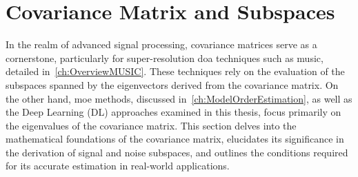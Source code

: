 




\section{Covariance Matrix and Subspaces}
\label{sec:CovarianceMatrix}
In the realm of advanced signal processing, covariance matrices serve as a cornerstone, particularly for
super-resolution \gls{doa} techniques such as \gls{music}, detailed in~\autoref{ch:OverviewMUSIC}. These techniques rely
on the evaluation of the subspaces spanned by the eigenvectors derived from the covariance matrix.
On the other hand, \gls{moe} methods, discussed in~\autoref{ch:ModelOrderEstimation}, as well as the Deep Learning (DL) approaches
examined in this thesis, focus primarily on the eigenvalues of the covariance matrix. This section delves into the
mathematical foundations of the covariance matrix, elucidates its significance in the derivation of signal and noise
subspaces, and outlines the conditions required for its accurate estimation in real-world applications.


